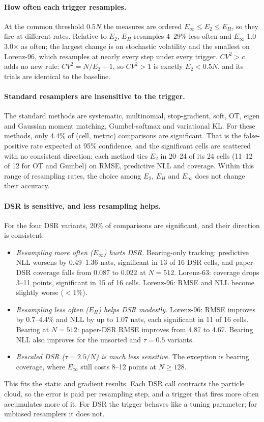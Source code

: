 \paragraph{How often each trigger resamples.} At the common threshold $0.5N$ the measures are ordered $E_\infty\le E_2\le E_H$, so they fire at different rates. Relative to $E_2$, $E_H$ resamples 4--29\% less often and $E_\infty$ 1.0--3.0$\times$ as often; the largest change is on stochastic volatility and the smallest on Lorenz-96, which resamples at nearly every step under every trigger. $CV^2>c$ adds no new rule: $CV^2=N/E_2-1$, so $CV^2>1$ is exactly $E_2<0.5N$, and its trials are identical to the baseline.

\paragraph{Standard resamplers are insensitive to the trigger.} The standard methods are systematic, multinomial, stop-gradient, soft, OT, eigen and Gaussian moment matching, Gumbel-softmax and variational KL. For these methods, only 4.4\% of (cell, metric) comparisons are significant. That is the false-positive rate expected at 95\% confidence, and the significant cells are scattered with no consistent direction: each method ties $E_2$ in 20--24 of its 24 cells (11--12 of 12 for OT and Gumbel) on RMSE, predictive NLL and coverage. Within this range of resampling rates, the choice among $E_2$, $E_H$ and $E_\infty$ does not change their accuracy.

\paragraph{DSR is sensitive, and less resampling helps.} For the four DSR variants, 20\% of comparisons are significant, and their direction is consistent.
\begin{itemize}
\item \emph{Resampling more often ($E_\infty$) hurts DSR.} Bearing-only tracking: predictive NLL worsens by 0.49--1.36 nats, significant in 13 of 16 DSR cells, and paper-DSR coverage falls from 0.087 to 0.022 at $N{=}512$. Lorenz-63: coverage drops 3--11 points, significant in 15 of 16 cells. Lorenz-96: RMSE and NLL become slightly worse ($<1\%$).
\item \emph{Resampling less often ($E_H$) helps DSR modestly.} Lorenz-96: RMSE improves by 0.7--4.4\% and NLL by up to 1.07 nats, each significant in 11 of 16 cells. Bearing at $N{=}512$: paper-DSR RMSE improves from 4.87 to 4.67. Bearing NLL also improves for the unsorted and $\tau{=}0.5$ variants.
\item \emph{Rescaled DSR ($\tau{=}2.5/N$) is much less sensitive.} The exception is bearing coverage, where $E_\infty$ still costs 8--12 points at $N\ge128$.
\end{itemize}
This fits the static and gradient results. Each DSR call contracts the particle cloud, so the error is paid per resampling step, and a trigger that fires more often accumulates more of it. For DSR the trigger behaves like a tuning parameter; for unbiased resamplers it does not.

